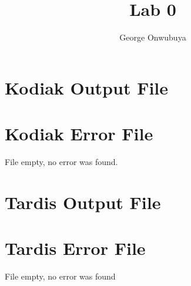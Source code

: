 \documentclass{article}
\title{Lab 0}
\author{George Onwubuya}
\begin{document}
\maketitle

\section{Kodiak Output File}
\section{Kodiak Error File}
File empty, no error was found.

\section{Tardis Output File}
\section{Tardis Error File}
File empty, no error was found
\end{document}
